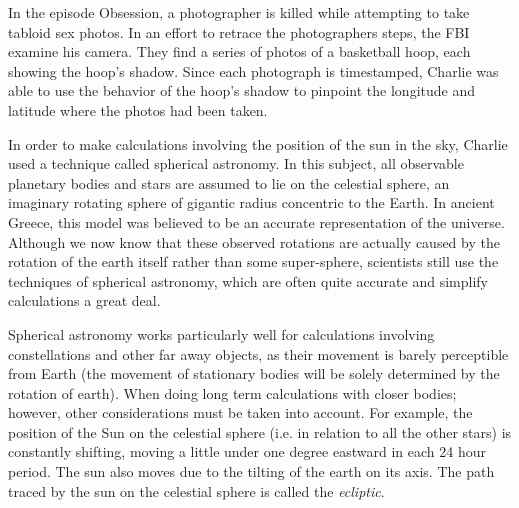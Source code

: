 \newpage
{}
{}
\setcounter{activity}{0}

In the episode Obsession, a photographer is killed while attempting to take tabloid sex photos. In an effort to retrace the photographers steps, the FBI examine his camera. They find a series of photos of a basketball hoop, each showing the hoop's shadow. Since each photograph is timestamped, Charlie was able to use the behavior of the hoop's shadow to pinpoint the longitude and latitude where the photos had been taken.




In order to make calculations involving the position of the sun in the sky, Charlie used a technique called spherical astronomy. In this subject, all observable planetary bodies and stars are assumed to lie on the celestial sphere, an imaginary rotating sphere of gigantic radius concentric to the Earth. In ancient Greece, this model was believed to be an accurate representation of the universe. Although we now know that these observed rotations are actually caused by the rotation of the earth itself rather than some super-sphere, scientists still use the techniques of spherical astronomy, which are often quite accurate and simplify calculations a great deal.


Spherical astronomy works particularly well for calculations involving constellations and other far away objects, as their movement is barely perceptible from Earth (the movement of stationary bodies will be solely determined by the rotation of earth). When doing long term calculations with closer bodies; however, other considerations must be taken into account. For example, the position of the Sun on the celestial sphere (i.e. in relation to all the other stars) is constantly shifting, moving a little under one degree eastward in each 24 hour period. The sun also moves due to the tilting of the earth on its axis. The path traced by the sun on the celestial sphere is called the \emph{ecliptic}.




